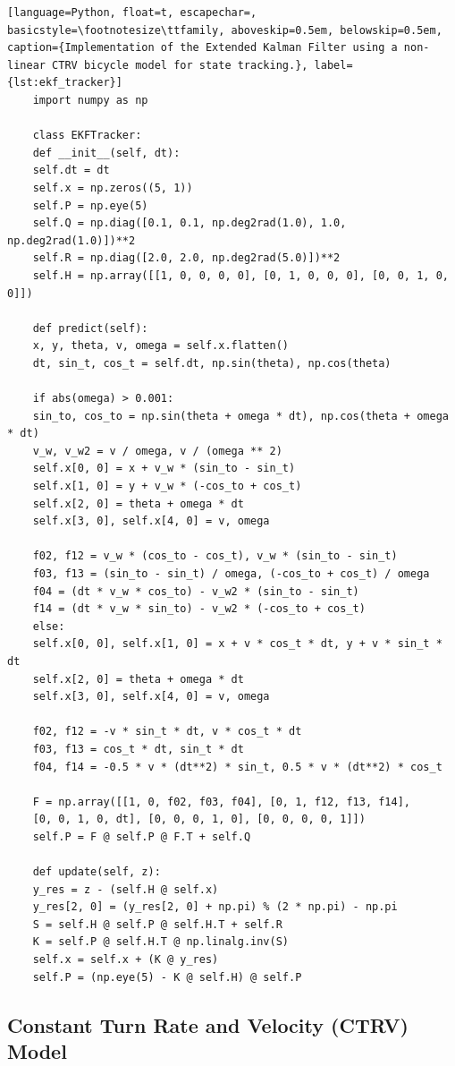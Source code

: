 \begin{lstlisting}[language=Python, float=t, escapechar=, basicstyle=\footnotesize\ttfamily, aboveskip=0.5em, belowskip=0.5em, caption={Implementation of the Extended Kalman Filter using a non-linear CTRV bicycle model for state tracking.}, label={lst:ekf_tracker}]
	import numpy as np
	
	class EKFTracker:
	def __init__(self, dt):
	self.dt = dt
	self.x = np.zeros((5, 1))
	self.P = np.eye(5) 
	self.Q = np.diag([0.1, 0.1, np.deg2rad(1.0), 1.0, np.deg2rad(1.0)])**2
	self.R = np.diag([2.0, 2.0, np.deg2rad(5.0)])**2 
	self.H = np.array([[1, 0, 0, 0, 0], [0, 1, 0, 0, 0], [0, 0, 1, 0, 0]])
	
	def predict(self):
	x, y, theta, v, omega = self.x.flatten()
	dt, sin_t, cos_t = self.dt, np.sin(theta), np.cos(theta)
	
	if abs(omega) > 0.001:
	sin_to, cos_to = np.sin(theta + omega * dt), np.cos(theta + omega * dt)
	v_w, v_w2 = v / omega, v / (omega ** 2)
	self.x[0, 0] = x + v_w * (sin_to - sin_t)
	self.x[1, 0] = y + v_w * (-cos_to + cos_t)
	self.x[2, 0] = theta + omega * dt
	self.x[3, 0], self.x[4, 0] = v, omega  
	
	f02, f12 = v_w * (cos_to - cos_t), v_w * (sin_to - sin_t)
	f03, f13 = (sin_to - sin_t) / omega, (-cos_to + cos_t) / omega
	f04 = (dt * v_w * cos_to) - v_w2 * (sin_to - sin_t)
	f14 = (dt * v_w * sin_to) - v_w2 * (-cos_to + cos_t)
	else:
	self.x[0, 0], self.x[1, 0] = x + v * cos_t * dt, y + v * sin_t * dt
	self.x[2, 0] = theta + omega * dt
	self.x[3, 0], self.x[4, 0] = v, omega  
	
	f02, f12 = -v * sin_t * dt, v * cos_t * dt
	f03, f13 = cos_t * dt, sin_t * dt
	f04, f14 = -0.5 * v * (dt**2) * sin_t, 0.5 * v * (dt**2) * cos_t
	
	F = np.array([[1, 0, f02, f03, f04], [0, 1, f12, f13, f14],
	[0, 0, 1, 0, dt], [0, 0, 0, 1, 0], [0, 0, 0, 0, 1]])
	self.P = F @ self.P @ F.T + self.Q
	
	def update(self, z):
	y_res = z - (self.H @ self.x)
	y_res[2, 0] = (y_res[2, 0] + np.pi) % (2 * np.pi) - np.pi
	S = self.H @ self.P @ self.H.T + self.R
	K = self.P @ self.H.T @ np.linalg.inv(S)
	self.x = self.x + (K @ y_res)
	self.P = (np.eye(5) - K @ self.H) @ self.P
\end{lstlisting}



\subsection{Constant Turn Rate and Velocity (CTRV) Model}
\label{sec:ctrv_theory}

